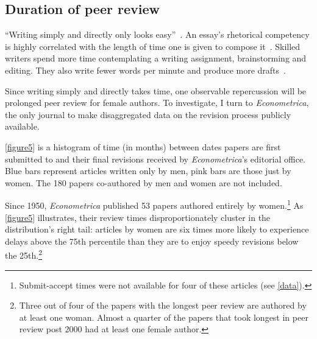 \subsection{Duration of peer review}
\label{duration}

``Writing simply and directly only looks easy''~\citep[][p. 53]{Kimble1994}. An essay's rhetorical competency is highly correlated with the length of time one is given to compose it~\citep{Hartvigsen1981,Kroll1990}. Skilled writers spend more time contemplating a writing assignment, brainstorming and editing. They also write fewer words per minute and produce more drafts~\citep{Faigley1981,Stallard1974}.

Since writing simply and directly takes time, one observable repercussion will be prolonged peer review for female authors. To investigate, I turn to \emph{Econometrica}, the only journal to make disaggregated data on the revision process publicly available.

\autoref{figure5} is a histogram of time (in months) between dates papers are first submitted to and their final revisions received by \emph{Econometrica}'s editorial office. Blue bars represent articles written only by men, pink bars are those just by women. The 180 papers co-authored by men and women are not included.



Since 1950, \emph{Econometrica} published 53 papers authored entirely by women.\footnote{Submit-accept times were not available for four of these articles (see \autoref{data}).} As \autoref{figure5} illustrates, their review times disproportionately cluster in the distribution's right tail: articles by women are six times more likely to experience delays above the 75th percentile than they are to enjoy speedy revisions below the 25th.\footnote{Three out of four of the papers with the longest peer review are authored by at least one woman. Almost a quarter of the papers that took longest in peer review post 2000 had at least one female author.}

